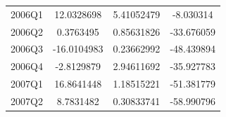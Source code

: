 \documentclass[11pt,preprint, authoryear]{elsarticle}
\let\origtable\table
\let\endorigtable\endtable
\renewenvironment{table}[1][2] {
    \expandafter\origtable\expandafter[H]
} {
    \endorigtable
}
\numberwithin{equation}{section}
\numberwithin{figure}{section}
\numberwithin{table}{section}
\begin{document}
\begin{table}
\begin{center}
\begin{tabular}{|c|c|c|c|}
2006Q1 & 12.0328698 & 5.41052479 & -8.030314 \\
2006Q2 & 0.3763495 & 0.85631826 & -33.676059 \\
2006Q3 & -16.0104983 & 0.23662992 & -48.439894 \\
2006Q4 & -2.8129879 & 2.94611692 & -35.927783 \\
2007Q1 & 16.8641448 & 1.18515221 & -51.381779 \\
2007Q2 & 8.7831482 & 0.30833741 & -58.990796 \\
\hline 
\end{tabular}
\caption{10 period ahead forecast results }
 \label{gdp10p}
\end{center}
\end{table}


\end{document}
